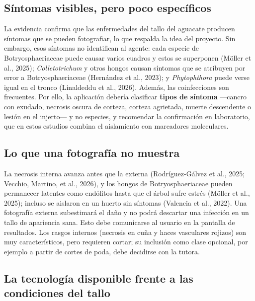 \documentclass[11pt]{article}
\newcommand{\sangria}{\hspace*{1.27cm}}
\begin{document}
\subsection{Síntomas visibles, pero poco específicos}

La evidencia confirma que las enfermedades del tallo del aguacate producen síntomas que se pueden fotografiar, lo que respalda la idea del proyecto. Sin embargo, esos síntomas no identifican al agente: cada especie de Botryosphaeriaceae puede causar varios cuadros y estos se superponen (Möller et al., 2025); \textit{Colletotrichum} y otros hongos causan síntomas que se atribuyen por error a Botryosphaeriaceae (Hernández et al., 2023); y \textit{Phytophthora} puede verse igual en el tronco (Linaldeddu et al., 2026). Además, las coinfecciones son frecuentes. Por ello, la aplicación debería clasificar \textbf{tipos de síntoma} —cancro con exudado, necrosis oscura de corteza, corteza agrietada, muerte descendente o lesión en el injerto— y no especies, y recomendar la confirmación en laboratorio, que en estos estudios combina el aislamiento con marcadores moleculares.

\subsection{Lo que una fotografía no muestra}

\sangria La necrosis interna avanza antes que la externa (Rodríguez-Gálvez et al., 2025; Vecchio, Martino, et al., 2026), y los hongos de Botryosphaeriaceae pueden permanecer latentes como endófitos hasta que el árbol sufre estrés (Möller et al., 2025); incluso se aislaron en un huerto sin síntomas (Valencia et al., 2022). Una fotografía externa subestimará el daño y no podrá descartar una infección en un tallo de apariencia sana. Esto debe comunicarse al usuario en la pantalla de resultados. Los rasgos internos (necrosis en cuña y haces vasculares rojizos) son muy característicos, pero requieren cortar; su inclusión como clase opcional, por ejemplo a partir de cortes de poda, debe decidirse con la tutora.

\subsection{La tecnología disponible frente a las condiciones del tallo}
\end{document}
